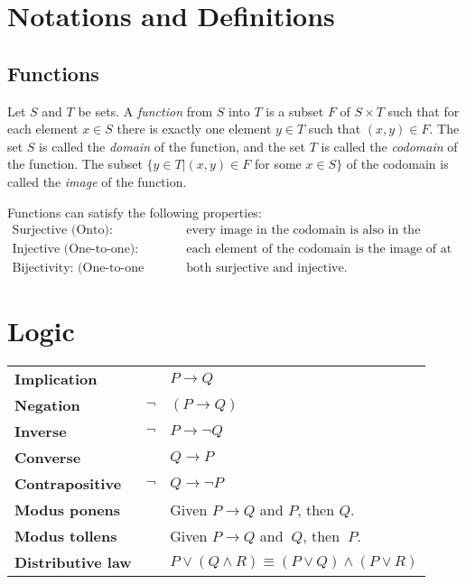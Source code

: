 \pagebreak

\tableofcontents %

\pagebreak

\section{Notations and Definitions}

\subsection{Functions}

Let $S$ and $T$ be sets. A \textit{function} from $S$ into $T$ is a subset $F$ of $S \times T$ such that for each element $x \in S$ there is exactly one element $y \in T$ such that $(x, y) \in F$. The set $S$ is called the \textit{domain} of the function, and the set $T$ is called the \textit{codomain} of the function. The subset $\{y \in T | (x, y) \in F$ for some $x \in S \}$ of the codomain is called the \textit{image} of the function.

Functions can satisfy the following properties:
\begin{align*}
\text{Surjective (Onto): }&\text{every image in the codomain is also in the range/image.}\\
\text{Injective (One-to-one): }&\text{each element of the codomain is the image of at most one element in the domain.}\\
\text{Bijectivity: (One-to-one correspondence) }&\text{both surjective and injective.}
\end{align*}

\pagebreak





\section{Logic}
\begin{tabular}{lrl}
	\textbf{Implication} && $P \rightarrow Q$\\

	\textbf{Negation} & $\neg$ & $(P \rightarrow Q)$\\

	\textbf{Inverse} & $\neg$ & $P \rightarrow \neg Q$\\

	\textbf{Converse} && $Q \rightarrow P$\\

	\textbf{Contrapositive} & $\neg$ & $Q \rightarrow \neg P$\\

	\textbf{Modus ponens} && Given $P \rightarrow Q$ and $P$, then $Q$.\\

	\textbf{Modus tollens} && Given $P \rightarrow Q$ and $~Q$, then $~P$.\\

	\textbf{Distributive law} && $P \vee (Q \wedge R) \equiv (P \vee Q) \wedge (P \vee R)$
\end{tabular}

